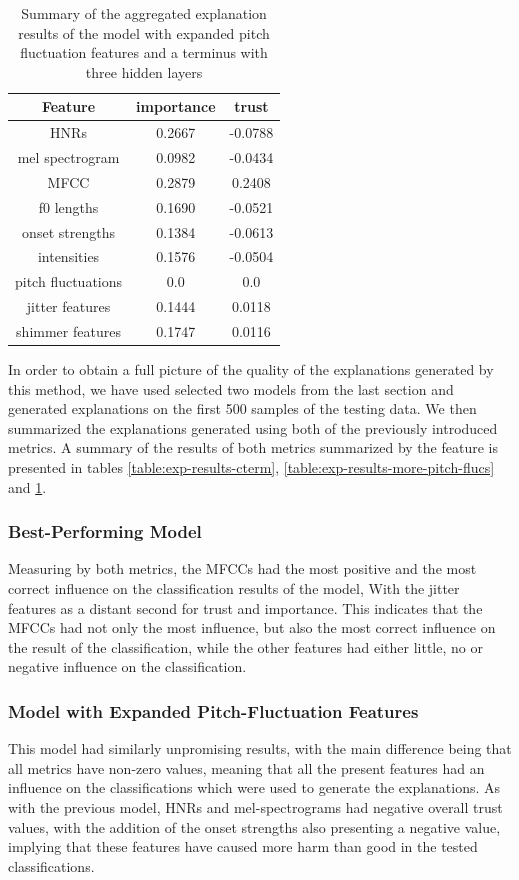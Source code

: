 \documentclass{article}
\begin{document}
		\begin{table}[htbp]
			\centering
			\begin{tabular}{c | c | c}
				Feature & importance & trust \\
				\hline
				HNRs & 0.2667 & -0.0788 \\
				mel spectrogram & 0.0982 & -0.0434 \\
				MFCC & 0.2879 & 0.2408 \\
				f0 lengths & 0.1690 & -0.0521 \\
				onset strengths & 0.1384 & -0.0613 \\
				intensities & 0.1576 & -0.0504 \\
				pitch fluctuations & 0.0 & 0.0 \\
				jitter features & 0.1444 & 0.0118 \\
				shimmer features & 0.1747 & 0.0116
			\end{tabular}
			\caption{Summary of the aggregated explanation results of the model with expanded
			pitch fluctuation features and a terminus with three hidden layers}
			\label{table:exp-results-mpf-cterm}
		\end{table}
		In order to obtain a full picture of the quality of the explanations generated by this
		method, we have used selected two models from the last section and generated explanations
		on the first 500 samples of the testing data. We then summarized the explanations generated
		using both of the previously introduced metrics. A summary of the results of both metrics
		summarized by the feature is presented in tables \ref{table:exp-results-cterm},
		\ref{table:exp-results-more-pitch-flucs} and \ref{table:exp-results-mpf-cterm}. 
		\subsubsection{Best-Performing Model}
		Measuring by both metrics, the MFCCs had the most positive and the most correct influence
		on the classification results of the model, With the jitter features as a distant second
		for trust and importance. This indicates that the MFCCs had not only the most influence,
		but also the most correct influence on the result of the classification, while the other
		features had either little, no or negative influence on the classification.
		\subsubsection{Model with Expanded Pitch-Fluctuation Features}
		This model had similarly unpromising results, with the main difference being that all
		metrics have non-zero values, meaning that all the present features had an influence on
		the classifications which were used to generate the explanations. As with the previous
		model, HNRs and mel-spectrograms had negative overall trust values, with the addition of
		the onset strengths also presenting a negative value, implying that these features have
		caused more harm than good in the tested classifications.
\end{document}

